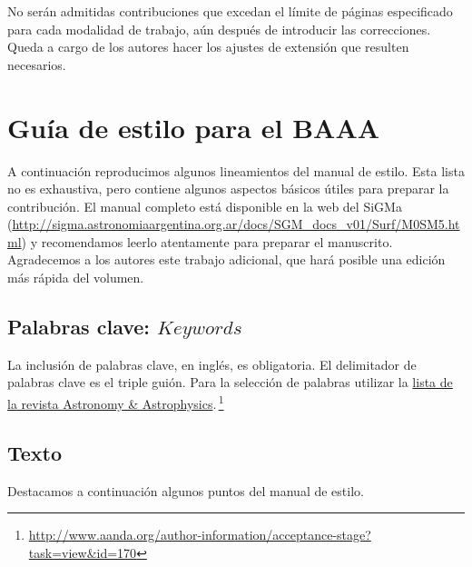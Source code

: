 \documentclass[baaa]{baaa}
\begin{document}
No serán admitidas contribuciones que excedan el límite de páginas especificado para cada modalidad de trabajo, aún después de introducir las correcciones. Queda a cargo de los autores hacer los ajustes de extensión que resulten necesarios.

\section{Guía de estilo para el BAAA}

A continuación reproducimos algunos lineamientos del manual de estilo. Esta lista no es exhaustiva, pero contiene algunos aspectos básicos útiles para preparar la contribución. El manual completo está disponible en la web del SiGMa (\url{http://sigma.astronomiaargentina.org.ar/docs/SGM_docs_v01/Surf/M0SM5.html}) y recomendamos leerlo atentamente para preparar el manuscrito. Agradecemos a los autores este trabajo adicional, que hará posible una edición más rápida del volumen.

\subsection{Palabras clave: $Keywords$}

La inclusión de palabras clave, en inglés, es obligatoria. El delimitador de palabras clave es el triple guión. Para la selección de palabras utilizar la \href{http://www.aanda.org/author-information/acceptance-stage?task=view&id=170}{lista de la revista Astronomy \& Astrophysics}.\,\footnote{\url{http://www.aanda.org/author-information/acceptance-stage?task=view&id=170}}

\subsection{Texto}

Destacamos a continuación algunos puntos del manual de estilo.
\end{document}
